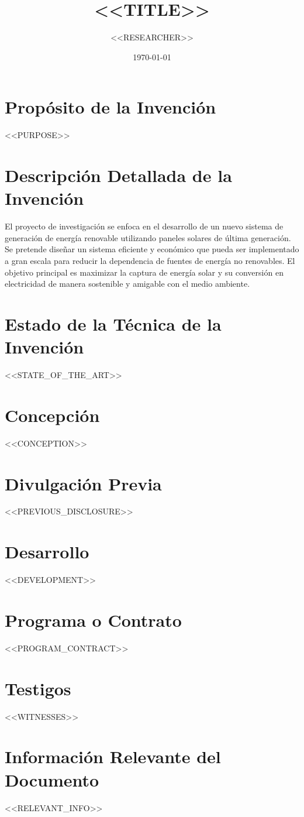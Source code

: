 \documentclass{article}
\title{<<TITLE>>}
\author{<<RESEARCHER>>}
\date{\today}
\begin{document}
\maketitle

\section*{Propósito de la Invención}
<<PURPOSE>>

\section*{Descripción Detallada de la Invención}
El proyecto de investigación se enfoca en el desarrollo de un nuevo sistema de generación de energía renovable utilizando paneles solares de última generación. Se pretende diseñar un sistema eficiente y económico que pueda ser implementado a gran escala para reducir la dependencia de fuentes de energía no renovables. El objetivo principal es maximizar la captura de energía solar y su conversión en electricidad de manera sostenible y amigable con el medio ambiente.

\section*{Estado de la Técnica de la Invención}
<<STATE_OF_THE_ART>>

\section*{Concepción}
<<CONCEPTION>>

\section*{Divulgación Previa}
<<PREVIOUS_DISCLOSURE>>

\section*{Desarrollo}
<<DEVELOPMENT>>

\section*{Programa o Contrato}
<<PROGRAM_CONTRACT>>

\section*{Testigos}
<<WITNESSES>>

\section*{Información Relevante del Documento}
<<RELEVANT_INFO>>
\end{document}
